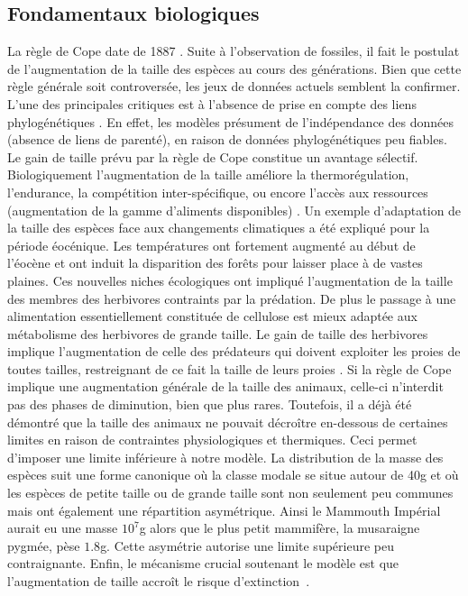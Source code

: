 \documentclass[fleqn,10pt]{SelfArx}
\begin{document}
\subsection*{Fondamentaux biologiques}
La règle de Cope date de 1887 \cite{stanley1973explanation}. Suite à l'observation de fossiles, il fait le postulat de l'augmentation de la taille des espèces au cours des générations. Bien que cette règle générale soit controversée, les jeux de données actuels semblent la confirmer. L'une des principales critiques est à l'absence de prise en compte des liens phylogénétiques \cite{lovegrove2013evolution}. En effet, les modèles présument de l’indépendance des données (absence de liens de parenté), en raison de données phylogénétiques peu fiables. 
\\Le gain de taille prévu par la règle de Cope constitue un avantage sélectif. Biologiquement l'augmentation de la taille améliore la thermorégulation, l'endurance,  la compétition  inter-spécifique, ou encore l'accès aux ressources (augmentation de la gamme d'aliments disponibles) \cite{stanley1973explanation}. Un exemple d'adaptation de la taille des espèces face aux changements climatiques a été expliqué pour la période éocénique. Les températures ont fortement augmenté au début de l'éocène et ont induit la disparition des forêts pour laisser place à de vastes plaines. Ces nouvelles niches écologiques ont impliqué l'augmentation de la taille des membres des herbivores contraints par la prédation. De plus le passage à une alimentation essentiellement constituée de cellulose est mieux adaptée aux métabolisme des herbivores de grande taille. Le gain de taille des herbivores implique l'augmentation de celle des prédateurs qui doivent exploiter les proies de toutes tailles, restreignant de ce fait la taille de leurs proies \cite{lovegrove2013evolution}. Si la règle de Cope implique une augmentation générale de la taille des animaux, celle-ci n'interdit pas des phases de diminution, bien que plus rares. Toutefois, il a déjà été démontré que la taille des animaux  ne pouvait décroître en-dessous de certaines limites en raison de contraintes physiologiques et thermiques. Ceci permet d'imposer une limite inférieure à notre modèle. La distribution de la masse des espèces suit une forme canonique où la classe modale se situe autour de 40g et où les espèces de petite taille ou de grande taille sont non seulement peu communes mais ont également une répartition asymétrique. Ainsi le Mammouth Impérial aurait eu une masse $10^7$g alors que le plus petit mammifère, la musaraigne pygmée, pèse $1.8$g. Cette asymétrie autorise une limite supérieure peu contraignante. Enfin, le mécanisme crucial soutenant le modèle est que l'augmentation de taille accroît le risque d'extinction \cite{clauset2008many}. %
\end{document}
